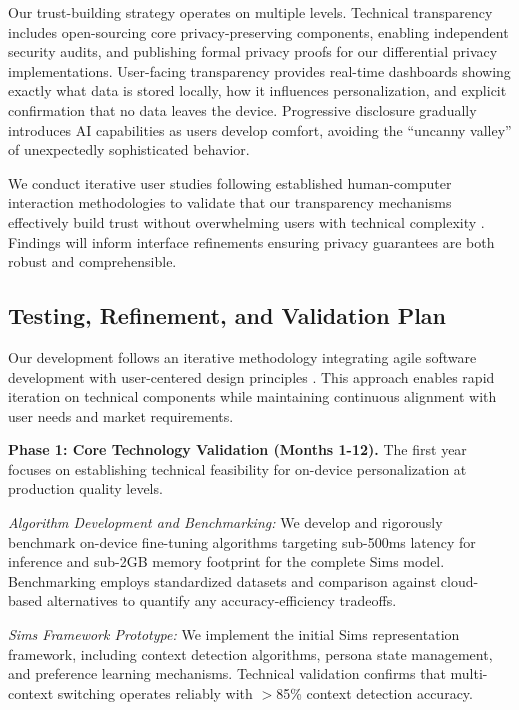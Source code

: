\documentclass[11pt]{article}
\begin{document}
Our trust-building strategy operates on multiple levels. Technical transparency includes open-sourcing core privacy-preserving components, enabling independent security audits, and publishing formal privacy proofs for our differential privacy implementations. User-facing transparency provides real-time dashboards showing exactly what data is stored locally, how it influences personalization, and explicit confirmation that no data leaves the device. Progressive disclosure gradually introduces AI capabilities as users develop comfort, avoiding the ``uncanny valley'' of unexpectedly sophisticated behavior.

We conduct iterative user studies following established human-computer interaction methodologies to validate that our transparency mechanisms effectively build trust without overwhelming users with technical complexity \cite{hussain2009current}. Findings will inform interface refinements ensuring privacy guarantees are both robust and comprehensible.

\vspace*{-8pt}
\subsection{Testing, Refinement, and Validation Plan}
\vspace*{-8pt}
Our development follows an iterative methodology integrating agile software development with user-centered design principles \cite{silva2011user}. This approach enables rapid iteration on technical components while maintaining continuous alignment with user needs and market requirements.

\textbf{Phase 1: Core Technology Validation (Months 1-12).}
The first year focuses on establishing technical feasibility for on-device personalization at production quality levels.

\textit{Algorithm Development and Benchmarking:} We develop and rigorously benchmark on-device fine-tuning algorithms targeting sub-500ms latency for inference and sub-2GB memory footprint for the complete Sims model. Benchmarking employs standardized datasets and comparison against cloud-based alternatives to quantify any accuracy-efficiency tradeoffs.

\textit{Sims Framework Prototype:} We implement the initial Sims representation framework, including context detection algorithms, persona state management, and preference learning mechanisms. Technical validation confirms that multi-context switching operates reliably with $>$85\% context detection accuracy.
\end{document}
